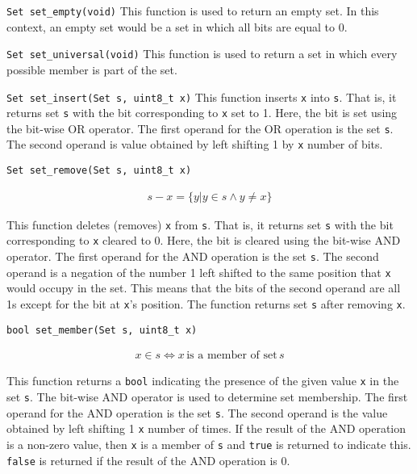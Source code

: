 \begin{funcdoc}{\texttt{Set set\_empty(void)}}
  This function is used to return an empty set. In this context, an empty
  set would be a set in which all bits are equal to 0.
\end{funcdoc}

\begin{funcdoc}{\texttt{Set set\_universal(void)}}
  This function is used to return a set in which every possible member
  is part of the set.
\end{funcdoc}

\begin{funcdoc}{\texttt{Set set\_insert(Set s, uint8\_t x)}}
  This function inserts \texttt{x} into \texttt{s}. That is, it returns
  set \texttt{s} with the bit corresponding to \texttt{x} set to 1.
  Here, the bit is set using the bit-wise OR operator. The first operand
  for the OR operation is the set \texttt{s}. The second operand is
  value obtained by left shifting 1 by \texttt{x} number of bits.
\end{funcdoc}

\begin{funcdoc}{\texttt{Set set\_remove(Set s, uint8\_t x)}}

\begin{align*}
  s - x = \{y | y \in s \land y \ne x\}
\end{align*}

  This function deletes (removes) \texttt{x} from \texttt{s}. That is,
  it returns set \texttt{s} with the bit corresponding to \texttt{x}
  cleared to 0. Here, the bit is cleared using the bit-wise AND
  operator. The first operand for the AND operation is the set
  \texttt{s}. The second operand is a negation of the number 1 left
  shifted to the same position that \texttt{x} would occupy in the set.
  This means that the bits of the second operand are all 1s except for
  the bit at \texttt{x}'s position. The function returns set \texttt{s}
  after removing \texttt{x}.
\end{funcdoc}

\begin{funcdoc}{\texttt{bool set\_member(Set s, uint8\_t x)}}

\begin{align*}
  x \in s \iff x\, \text{is a member of set}\, s
\end{align*}

  \noindent This function returns a \texttt{bool} indicating the
  presence of the given value \texttt{x} in the set \texttt{s}. The
  bit-wise AND operator is used to determine set membership. The first
  operand for the AND operation is the set \texttt{s}. The second
  operand is the value obtained by left shifting 1 \texttt{x} number of
  times. If the result of the AND operation is a non-zero value, then
  \texttt{x} is a member of \texttt{s} and \texttt{true} is returned to
  indicate this. \texttt{false} is returned if the result of the AND
  operation is 0.
\end{funcdoc}

